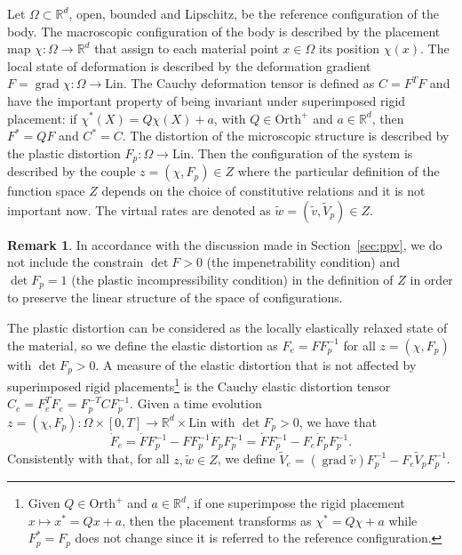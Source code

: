 \documentclass[a4paper,10pt,oneside]{amsbook}
\numberwithin{section}{chapter}
\numberwithin{equation}{chapter}
\theoremstyle{definition}
\newtheorem{rmk}[prop]{Remark}
\DeclareMathOperator{\grad}{grad}
\begin{document}
Let $\Omega\subset\mathbb{R}^d$, open, bounded and Lipschitz, be the reference configuration of the body. The macroscopic configuration of the body is described by the placement map $\chi\colon\Omega\to\mathbb{R}^d$ that assign to each material point $x\in\Omega$ its position $\chi(x)$. The local state of deformation is described by the deformation gradient $F=\grad\chi\colon\Omega\to\text{Lin}$. The Cauchy deformation tensor is defined as $C=F^TF$ and have the important property of being invariant under superimposed rigid placement: if $\chi^*(X)=Q\chi(X)+a$, with $Q\in\text{Orth}^+$ and $a\in\mathbb{R}^d$, then $F^*=QF$ and $C^*=C$. The distortion of the microscopic structure is described by the plastic distortion $F_p\colon\Omega\to\text{Lin}$. Then the configuration of the system is described by the couple $z=(\chi,F_p)\in Z$ where the particular definition of the function space $Z$ depends on the choice of constitutive relations and it is not important now. The virtual rates are denoted as $\tilde w=(\tilde v,\tilde V_p)\in Z$.
\begin{rmk}
In accordance with the discussion made in Section~\ref{sec:ppv}, we do not include the constrain $\det F>0$ (the impenetrability condition) and $\det F_p=1$ (the plastic incompressibility condition) in the definition of $Z$ in order to preserve the linear structure of the space of configurations.
\end{rmk}

The plastic distortion can be considered as the locally elastically relaxed state of the material, so we define the elastic distortion as $F_e=FF_p^{-1}$ for all $z=(\chi,F_p)$ with $\det F_p>0$. A measure of the elastic distortion that is not affected by superimposed rigid placements\footnote{Given $Q\in\text{Orth}^+$ and $a\in\mathbb{R}^d$, if one superimpose the rigid placement $x\mapsto x^*=Qx+a$, then the placement transforms as $\chi^*=Q\chi+a$ while $F_p^*=F_p$ does not change since it is referred to the reference configuration.} is the Cauchy elastic distortion tensor $C_e=F_e^TF_e=F_p^{-T}CF_p^{-1}$. Given a time evolution $z=(\chi,F_p)\colon\Omega\times[0,T]\to\mathbb{R}^d\times\text{Lin}$ with $\det F_p>0$, we have that
\[
\dot F_e=\dot FF_p^{-1}-FF_p^{-1}\dot F_pF_p^{-1}=\dot FF_p^{-1}-F_e\dot F_pF_p^{-1}.
\]
Consistently with that, for all $z,\tilde w\in Z$, we define $\tilde V_e=(\grad\tilde v)F_p^{-1}-F_e\tilde V_pF_p^{-1}$.
\end{document}
